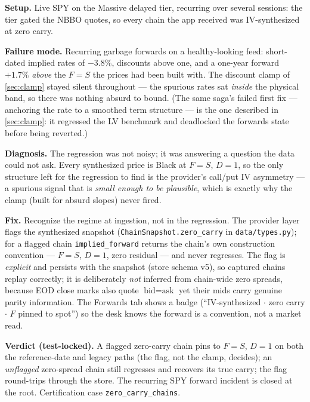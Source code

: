 \documentclass[11pt]{article}
\begin{document}
\begin{example}[title={Case file: the garbage forwards the clamp could not see}]
\textbf{Setup.} Live SPY on the Massive delayed tier, recurring over several
sessions: the tier gated the NBBO quotes, so every chain the app received was
IV-synthesized at zero carry.

\textbf{Failure mode.} Recurring garbage forwards on a healthy-looking feed:
short-dated implied rates of $-3.8\%$, discounts above one, and a one-year
forward $+1.7\%$ \emph{above} the $F=S$ the prices had been built with. The
discount clamp of \cref{sec:clamp} stayed silent throughout --- the spurious
rates sat \emph{inside} the physical band, so there was nothing absurd to
bound. (The same saga's failed first fix --- anchoring the rate to a smoothed
term structure --- is the one described in \cref{sec:clamp}: it regressed the
LV benchmark and deadlocked the forwards state before being reverted.)

\textbf{Diagnosis.} The regression was not noisy; it was answering a question
the data could not ask. Every synthesized price is Black at $F=S$, $D=1$, so
the only structure left for the regression to find is the provider's call/put
IV asymmetry --- a spurious signal that is \emph{small enough to be
plausible}, which is exactly why the clamp (built for absurd slopes) never
fired.

\textbf{Fix.} Recognize the regime at ingestion, not in the regression. The
provider layer flags the synthesized snapshot
(\texttt{ChainSnapshot.zero\_carry} in \texttt{data/types.py}); for a flagged
chain \texttt{implied\_forward} returns the chain's own construction
convention --- $F=S$, $D=1$, zero residual --- and never regresses. The flag
is \emph{explicit} and persists with the snapshot (store schema v5), so
captured chains replay correctly; it is deliberately \emph{not} inferred from
chain-wide zero spreads, because EOD close marks also quote
$\text{bid}=\text{ask}$ yet their mids carry genuine parity information. The
Forwards tab shows a badge (``IV-synthesized $\cdot$ zero carry $\cdot$ $F$
pinned to spot'') so the desk knows the forward is a convention, not a market
read.

\textbf{Verdict (test-locked).} A flagged zero-carry chain pins to $F=S$,
$D=1$ on both the reference-date and legacy paths (the flag, not the clamp,
decides); an \emph{unflagged} zero-spread chain still regresses and recovers
its true carry; the flag round-trips through the store. The recurring SPY
forward incident is closed at the root. Certification case
\texttt{zero\_carry\_chains}.
\end{example}
\end{document}

